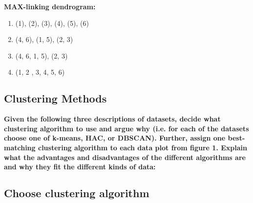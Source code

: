 		{\bf MAX-linking dendrogram:}
			\begin{enumerate}
				\item (1), (2), (3), (4), (5), (6)
				\item (4, 6), (1,  5), (2, 3)
				\item (4, 6, 1, 5), (2, 3)
				\item (1, 2 , 3, 4, 5, 6)
			\end{enumerate}


 
	\clearpage
	\subsection{Clustering Methods}
		{\bf Given the following three descriptions of datasets, decide what clustering algorithm
		to use and argue why (i.e. for each of the datasets choose one of k-means, HAC, or DBSCAN).
		Further, assign one best-matching clustering algorithm to each data plot from figure 1. Explain
		what the advantages and disadvantages of the different algorithms are and why they fit
		the different kinds of data:}

		\noindent\makebox[\linewidth]{\rule{\textwidth}{1pt}} 

		\subsection*{Choose clustering algorithm}
		
